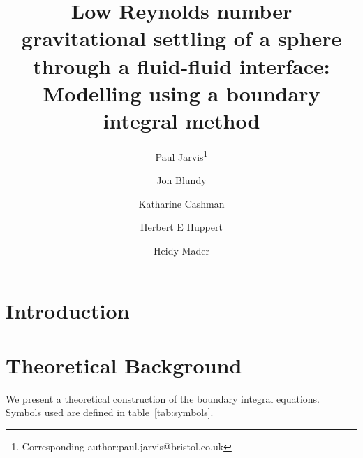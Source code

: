 \documentclass[12pt]{article}
\begin{document}
\thispagestyle{empty}

\title{Low Reynolds number gravitational settling of a sphere through a fluid-fluid interface: Modelling using a boundary integral method}

\author[1]{Paul Jarvis\footnote{Corresponding author:paul.jarvis@bristol.co.uk}}
\author[1]{Jon Blundy}
\author[1]{Katharine Cashman}
\author[1,2]{Herbert E Huppert}
\author[1]{Heidy Mader}
\date{}


\maketitle

\begin{abstract}


\end{abstract}


\section{Introduction}
\label{sec:intro}


\section{Theoretical Background}
\label{sec:theory}

We present a theoretical construction of the boundary integral equations. Symbols used are defined in table~\ref{tab:symbols}.
\end{document}
